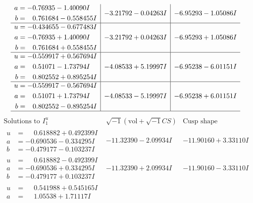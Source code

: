 \documentclass[1p]{elsarticle_modified}
\theoremstyle{definition}
\newcommand{\I}{\sqrt{-1}}
\begin{document}
$$\begin{array}{c|c|c}
\begin{aligned}
a &= -0.76935 - 1.40090 I \\
b &= \phantom{-}0.761684 - 0.558455 I\end{aligned}
 & -3.21792 - 0.04263 I & -6.95293 - 1.05086 I \\ \hline\begin{aligned}
u &= -0.434655 - 0.677483 I \\
a &= -0.76935 + 1.40090 I \\
b &= \phantom{-}0.761684 + 0.558455 I\end{aligned}
 & -3.21792 + 0.04263 I & -6.95293 + 1.05086 I \\ \hline\begin{aligned}
u &= -0.559917 + 0.567694 I \\
a &= \phantom{-}0.51071 - 1.73794 I \\
b &= \phantom{-}0.802552 + 0.895254 I\end{aligned}
 & -4.08533 + 5.19997 I & -6.95238 - 6.01151 I \\ \hline\begin{aligned}
u &= -0.559917 - 0.567694 I \\
a &= \phantom{-}0.51071 + 1.73794 I \\
b &= \phantom{-}0.802552 - 0.895254 I\end{aligned}
 & -4.08533 - 5.19997 I & -6.95238 + 6.01151 I\\
 \hline 
 \end{array}$$\newpage$$\begin{array}{c|c|c}  
\text{Solutions to }I^u_{1}& \I (\text{vol} + \sqrt{-1}CS) & \text{Cusp shape}\\
 \hline 
\begin{aligned}
u &= \phantom{-}0.618882 + 0.492399 I \\
a &= -0.690536 - 0.334295 I \\
b &= -0.479177 - 0.103237 I\end{aligned}
 & -11.32390 - 2.09934 I & -11.90160 + 3.33110 I \\ \hline\begin{aligned}
u &= \phantom{-}0.618882 - 0.492399 I \\
a &= -0.690536 + 0.334295 I \\
b &= -0.479177 + 0.103237 I\end{aligned}
 & -11.32390 + 2.09934 I & -11.90160 - 3.33110 I \\ \hline\begin{aligned}
u &= \phantom{-}0.541988 + 0.545165 I \\
a &= \phantom{-}1.05538 + 1.71117 I \\

\end{aligned}
\end{array}$$
\end{document}

